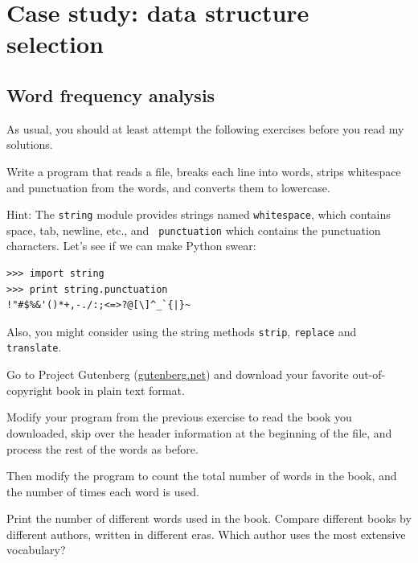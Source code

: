\chapter{Case study: data structure selection}

\section{Word frequency analysis}
\label{analysis}

As usual, you should at least attempt the following exercises
before you read my solutions.

\begin{ex}
Write a program that reads a file, breaks each line into
words, strips whitespace and punctuation from the words, and
converts them to lowercase.


Hint: The {\tt string} module provides strings named {\tt whitespace},
which contains space, tab, newline, etc., and {\tt
  punctuation} which contains the punctuation characters.  Let's see
if we can make Python swear:

\beforeverb
\begin{verbatim}
>>> import string
>>> print string.punctuation
!"#$%&'()*+,-./:;<=>?@[\]^_`{|}~
\end{verbatim}
\afterverb
%
Also, you might consider using the string methods {\tt strip},
{\tt replace} and {\tt translate}.


\end{ex}


\begin{ex}


Go to Project Gutenberg (\url{gutenberg.net}) and download 
your favorite out-of-copyright book in plain text format.


Modify your program from the previous exercise to read the book
you downloaded, skip over the header information at the beginning
of the file, and process the rest of the words as before.

Then modify the program to count the total number of words in
the book, and the number of times each word is used.


Print the number of different words used in the book.  Compare
different books by different authors, written in different eras.
Which author uses the most extensive vocabulary?
\end{ex}


